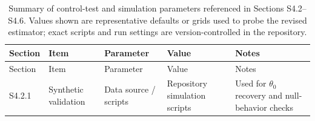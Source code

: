 \documentclass[
]{article}
\begin{document}
\begin{longtable}[]{@{}
  >{\raggedright\arraybackslash}p{}
  >{\raggedright\arraybackslash}p{}
  >{\raggedright\arraybackslash}p{}
  >{\raggedright\arraybackslash}p{}
  >{\raggedright\arraybackslash}p{}@{}}
\caption{Summary of control-test and simulation parameters referenced in
Sections S4.2--S4.6. Values shown are representative defaults or grids
used to probe the revised estimator; exact scripts and run settings are
version-controlled in the
repository.}\label{tbl:si_sim_params}\tabularnewline
\toprule\noalign{}
\begin{minipage}[b]{\linewidth}\raggedright
Section
\end{minipage} & \begin{minipage}[b]{\linewidth}\raggedright
Item
\end{minipage} & \begin{minipage}[b]{\linewidth}\raggedright
Parameter
\end{minipage} & \begin{minipage}[b]{\linewidth}\raggedright
Value
\end{minipage} & \begin{minipage}[b]{\linewidth}\raggedright
Notes
\end{minipage} \\
\midrule\noalign{}
\endfirsthead
\toprule\noalign{}
\begin{minipage}[b]{\linewidth}\raggedright
Section
\end{minipage} & \begin{minipage}[b]{\linewidth}\raggedright
Item
\end{minipage} & \begin{minipage}[b]{\linewidth}\raggedright
Parameter
\end{minipage} & \begin{minipage}[b]{\linewidth}\raggedright
Value
\end{minipage} & \begin{minipage}[b]{\linewidth}\raggedright
Notes
\end{minipage} \\
\midrule\noalign{}
\endhead
\bottomrule\noalign{}
\endlastfoot
S4.2.1 & Synthetic validation & Data source / scripts & Repository
simulation scripts & Used for \(\theta_0\) recovery and null-behavior
checks \\

\end{longtable}
\end{document}
